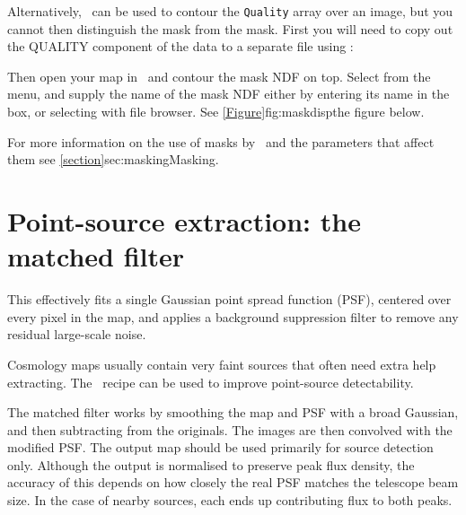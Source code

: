 Alternatively, \gaia\ can be used to contour the \texttt{Quality} array
over an image, but you cannot then distinguish the  mask from
the  mask. First you will need to copy out the QUALITY component
of the data to a separate file using :

\begin{terminalv}
\end{terminalv}

Then open your map in \gaia\ and contour the mask NDF on top.
Select  from the 
menu, and supply the name of the mask NDF either by entering its name in
the  box, or selecting with
 file browser. See
\cref{Figure}{fig:maskdisp}{the figure below}.

For more information on the use of masks by \makemap\ and the
parameters that affect them see \cref{section}{sec:masking}{Masking}.



\section{Point-source extraction: the matched filter}
\label{sec:mf}

This effectively fits a single Gaussian point spread function (PSF),
centered over every pixel in the map, and applies a background
suppression filter to remove any residual large-scale noise.

Cosmology maps usually contain very faint sources that often need
extra help extracting. The \picard\ recipe
can be used to improve point-source detectability.

The matched filter works by smoothing the map and PSF with a broad
Gaussian, and then subtracting from the originals. The images are then
convolved with the modified PSF. The output map should be used
primarily for source detection only. Although the output is normalised
to preserve peak flux density, the accuracy of this depends on how
closely the real PSF matches the telescope beam size. In the case of
nearby sources, each ends up contributing flux to both peaks.

